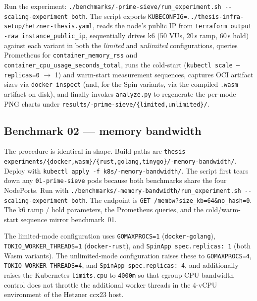 \begin{sloppypar}
Run the experiment: \texttt{./benchmarks/-prime-sieve/\allowbreak run\_experiment.sh\allowbreak{} -{}-scaling-experiment both}. The script exports \texttt{KUBECONFIG=\allowbreak../\allowbreak thesis-infra-setup/\allowbreak hetzner-thesis.yaml}, reads the node's public \acs{IP} from \texttt{terraform output\allowbreak{} -raw\allowbreak{} instance\_public\_ip}, sequentially drives k6 (50 \acp{VU}, 20\,s ramp, 60\,s hold) against each variant in both the \emph{limited} and \emph{unlimited} configurations, queries Prometheus for \texttt{container\_memory\_rss} and \texttt{container\_cpu\_usage\_seconds\_total}, runs the cold-start (\texttt{kubectl scale --replicas=0} $\to$ 1) and warm-start measurement sequences, captures \acs{OCI} artifact sizes via \texttt{docker inspect} (and, for the Spin variants, via the compiled \texttt{.wasm} artifact on disk), and finally invokes \texttt{analyze.py} to regenerate the per-mode PNG charts under \texttt{results/-prime-sieve/\allowbreak\{limited,unlimited\}/}.
\end{sloppypar}

\subsection{Benchmark 02 --- memory bandwidth}
\label{sec:repro_workflow_02}

\begin{sloppypar}
The procedure is identical in shape. Build paths are \texttt{thesis-experiments/\allowbreak\{docker,wasm\}/\allowbreak\{rust,golang,tinygo\}/-memory-bandwidth/}. Deploy with \texttt{kubectl apply -f k8s/-memory-bandwidth/}. The script first tears down any \texttt{01-prime-sieve} pods because both benchmarks share the four NodePorts. Run with \texttt{./benchmarks/-memory-bandwidth/\allowbreak run\_experiment.sh\allowbreak{} -{}-scaling-experiment both}. The endpoint is \texttt{GET /membw?size\_kb=64\&no\_hash=0}. The k6 ramp / hold parameters, the Prometheus queries, and the cold/warm-start sequence mirror benchmark~01.
\end{sloppypar}

\begin{sloppypar}
The limited-mode configuration uses \texttt{GOMAXPROCS=1} (\texttt{docker-golang}), \texttt{TOKIO\_WORKER\_THREADS=1} (\texttt{docker-rust}), and \texttt{SpinApp~spec.replicas:~1} (both \acs{Wasm} variants). The unlimited-mode configuration raises these to \texttt{GOMAXPROCS=4}, \texttt{TOKIO\_WORKER\_THREADS=4}, and \texttt{SpinApp~spec.replicas:~4}, and additionally raises the Kubernetes \texttt{limits.cpu} to \texttt{4000m} so that cgroup CPU bandwidth control does not throttle the additional worker threads in the 4-vCPU environment of the Hetzner ccx23 host.
\end{sloppypar}

